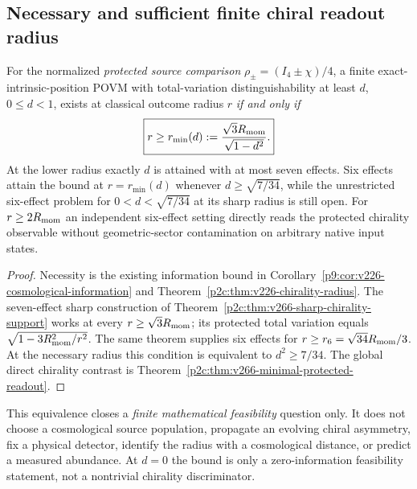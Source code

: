 \documentclass[12pt,a4paper]{article}
\begin{document}
\subsection{Necessary and sufficient finite chiral readout radius}
\label{p6b:sec:v266-chiral-feasibility}
\begin{corollary}
\label{p6b:cor:v266-chiral-feasibility}
For the normalized \emph{protected source comparison}
$\rho_\pm=(I_4\pm\chi)/4$, a finite exact-intrinsic-position POVM
with total-variation distinguishability at least $d$, $0\le d<1$,
exists at classical outcome radius $r$ \emph{if and only if}
\[
\boxed{r\ge r_{\min}(d):=
\frac{\sqrt3R_{\mathrm{mom}}}{\sqrt{1-d^2}}.}
\]
At the lower radius exactly $d$ is attained with at most seven effects.
Six effects attain the bound at $r=r_{\min}(d)$ whenever
$ d\ge\sqrt{7/34}$, while the unrestricted six-effect problem for
$0<d<\sqrt{7/34}$ at its sharp radius is still open.
For $r\ge2R_{\mathrm{mom}}$ an independent six-effect setting directly reads the
protected chirality observable without geometric-sector
contamination on arbitrary native input states.
\end{corollary}
\begin{proof}
Necessity is the existing information bound in
Corollary~\ref{p9:cor:v226-cosmological-information} and
Theorem~\ref{p2c:thm:v226-chirality-radius}.
The seven-effect sharp construction of
Theorem~\ref{p2c:thm:v266-sharp-chirality-support} works at every
$r\ge\sqrt3R_{\mathrm{mom}}$; its protected total variation equals
$\sqrt{1-3R_{\mathrm{mom}}^2/r^2}$. The same theorem supplies six effects
for $r\ge r_6=\sqrt{34}R_{\mathrm{mom}}/3$. At the necessary radius this
condition is equivalent to $d^2\ge7/34$.
The global direct chirality contrast is
Theorem~\ref{p2c:thm:v266-minimal-protected-readout}.
\end{proof}
This equivalence closes a \emph{finite mathematical feasibility}
question only. It does not choose a cosmological source population,
propagate an evolving chiral asymmetry, fix a physical detector,
identify the radius with a cosmological distance, or predict a
measured abundance. At $d=0$ the bound is only a zero-information
feasibility statement, not a nontrivial chirality discriminator.




\end{document}
